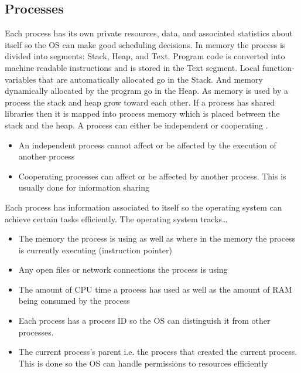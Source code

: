 \documentclass[onecolumn,draftclsnofoot, 10pt, compsoc]{IEEEtran}
\def \ParSpace{\vspace{.75em}}
\begin{document}
\subsection{Processes}
	Each process has its own private resources, data, and associated statistics about itself so the OS can make good scheduling decisions. 
	In memory the process is divided into segments: Stack, Heap, and Text. Program code is converted into machine readable instructions and is stored in the Text segment. 
	Local function-variables that are automatically allocated go in the Stack. 
	And memory dynamically allocated by the program go in the Heap. 
	As memory is used by a process the stack and heap grow toward each other. 
	If a process has shared libraries then it is mapped into process memory which is placed between the stack and the heap.
	A process can either be independent or cooperating \cite{processesLinux}.
	\begin{itemize}
		\item An independent process cannot affect or be affected by the execution of another process
		\item Cooperating processes can affect or be affected by another process. This is usually done for information sharing
	\end{itemize}

	\ParSpace
	Each process has information associated to itself so the operating system can achieve certain tasks efficiently.  The operating system tracks\dots
	\begin{itemize}
		\item The memory the process is using as well as where in the memory the process is currently executing (instruction pointer)
		\item Any open files or network connections the process is using
		\item The amount of CPU time a process has used as well as the amount of RAM being consumed by the process
		\item Each process has a process ID so the OS can distinguish it from other processes. 
		\item The current process's parent i.e. the process that created the current process. This is done so the OS can handle permissions to resources efficiently
	\end{itemize}
	
\end{document}
